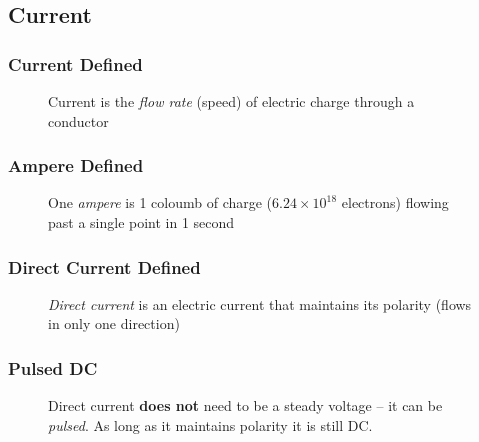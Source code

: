 \subsection{Current}

\begin{frame}
    \frametitle{Current Defined}

    \begin{figure}
        \centering
            

        {\footnotesize Current is the \emph{flow rate} (speed) of electric charge through a conductor\par}
    \end{figure}    

\end{frame}

\begin{frame}
    \frametitle{Ampere Defined}

    \begin{figure}
        \centering
            

        {\footnotesize One \emph{ampere} is 1 coloumb of charge ($6.24 \times 10^{18}$ electrons) flowing past a single point in 1 second\par}
    \end{figure}

\end{frame}

\begin{frame}
    \frametitle{Direct Current Defined}

    \begin{figure}
        \centering
            

        {\footnotesize \emph{Direct current} is an electric current that maintains its polarity (flows in only one direction)\par}

    \end{figure}

\end{frame}

\begin{frame}
    \frametitle{Pulsed DC}

    \begin{figure}
        \centering
            

        {\footnotesize Direct current \textbf{does not} need to be a steady voltage -- it can be \emph{pulsed}. As long as it maintains polarity it is still DC.\par}

    \end{figure}

\end{frame}

